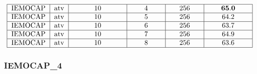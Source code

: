 \documentclass[a4paper]{article}
\begin{document}
\begin{itemize}
\[\begin{tabular}{|c|c|p{2.5cm}<{\centering}|p{1.5cm}<{\centering}|p{1.5cm}<{\centering}|p{2cm}<{\centering}|}
            \hline
            \text{IEMOCAP} & \text{atv} & 10 & 4 & 256 & \(\mathbf{65.0}\) \\
            \hline
            \text{IEMOCAP} & \text{atv} & 10 & 5 & 256 & 64.2 \\
            \hline
            \text{IEMOCAP} & \text{atv} & 10 & 6 & 256 & 63.7 \\
            \hline
            \text{IEMOCAP} & \text{atv} & 10 & 7 & 256 & 64.9 \\
            \hline
            \text{IEMOCAP} & \text{atv} & 10 & 8 & 256 & 63.6 \\
            \hline
        \end{tabular}    
        \]
\end{itemize}

\subsubsection{IEMOCAP\_4}
\end{document}
